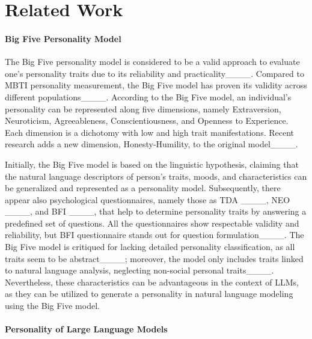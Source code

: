 \section{Related Work}
\paragraph{Big Five Personality Model} 

The Big Five personality model is considered to be a valid approach to evaluate one's personality traits due to its reliability and practicality____. Compared to MBTI personality measurement, the Big Five model has proven its validity across different populations____. According to the Big Five model, an individual's personality can be represented along five dimensions, namely Extraversion, Neuroticism, Agreeableness, Conscientiousness, and Openness to Experience. Each dimension is a dichotomy with low and high trait manifestations. Recent research adds a new dimension, Honesty-Humility, to the original model____.

Initially, the Big Five model is based on the linguistic hypothesis, claiming that the natural language descriptors of person's traits, moods, and characteristics can be generalized and represented as a personality model. Subsequently, there appear also psychological questionnaires, namely those as TDA ____, NEO ____, and BFI ____, that help to determine personality traits by answering a predefined set of questions. All the questionnaires show respectable validity and reliability, but BFI questionnaire stands out for question formulation____. The Big Five model is critiqued for lacking detailed personality classification, as all traits seem to be abstract____; moreover, the model only includes traits linked to natural language analysis, neglecting non-social personal traits____. Nevertheless, these characteristics can be advantageous in the context of LLMs, as they can be utilized to generate a personality in natural language modeling using the Big Five model.


\paragraph{Personality of Large Language Models}

